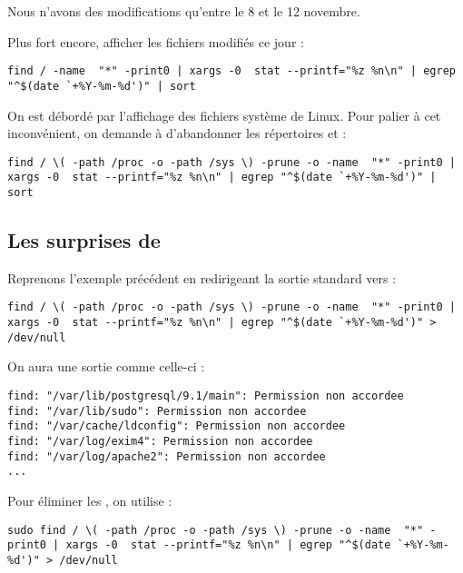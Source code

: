 Nous n'avons des modifications qu'entre le 8 et le 12 novembre.

Plus fort encore, afficher les fichiers modifiés ce jour :

\begin{lstlisting}[caption=recherche d'une attaque part IV]
find / -name  "*" -print0 | xargs -0  stat --printf="%z %n\n" | egrep "^$(date `+%Y-%m-%d')" | sort
\end{lstlisting}

On est débordé par l'affichage des fichiers système de Linux. Pour palier à cet inconvénient, on demande à  d'abandonner les répertoires  et  :

\begin{lstlisting}[caption=recherche d'une attaque part V et fin]
find / \( -path /proc -o -path /sys \) -prune -o -name  "*" -print0 | xargs -0  stat --printf="%z %n\n" | egrep "^$(date `+%Y-%m-%d')" | sort
\end{lstlisting}

\subsection{Les surprises de }
Reprenons l'exemple précédent en redirigeant la sortie standard vers  :

\begin{lstlisting}[caption=avec redirection]
find / \( -path /proc -o -path /sys \) -prune -o -name  "*" -print0 | xargs -0  stat --printf="%z %n\n" | egrep "^$(date `+%Y-%m-%d')" > /dev/null
\end{lstlisting}

On aura une sortie comme celle-ci :

\begin{lstlisting}[caption=problèmes de droits part I]
find: "/var/lib/postgresql/9.1/main": Permission non accordee
find: "/var/lib/sudo": Permission non accordee
find: "/var/cache/ldconfig": Permission non accordee
find: "/var/log/exim4": Permission non accordee
find: "/var/log/apache2": Permission non accordee
...
\end{lstlisting}

Pour éliminer les , on utilise  :

\begin{lstlisting}[caption=problèmes de droits part I en pire]
sudo find / \( -path /proc -o -path /sys \) -prune -o -name  "*" -print0 | xargs -0  stat --printf="%z %n\n" | egrep "^$(date `+%Y-%m-%d')" > /dev/null
\end{lstlisting}

